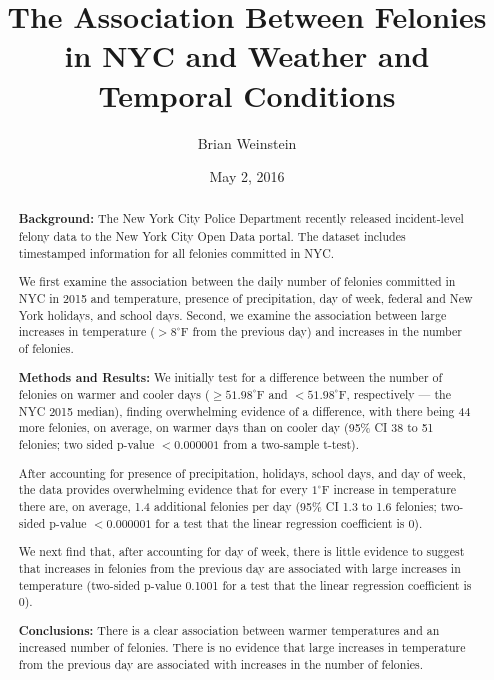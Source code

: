\documentclass[11pt,notitlepage]{article}
\newcommand{\degf}{^\circ\text{F}}
\begin{document}
\title{The Association Between Felonies in NYC and Weather and Temporal Conditions}
\author{Brian Weinstein}
\date{May 2, 2016}

\maketitle



\begin{abstract}
\singlespacing

\noindent \textbf{Background:} The New York City Police Department recently released incident-level felony data to the New York City Open Data portal. The dataset includes timestamped information for all felonies committed in NYC.

We first examine the association between the daily number of felonies committed in NYC in 2015 and temperature, presence of precipitation, day of week, federal and New York holidays, and school days. Second, we examine the association between large increases in temperature ($>8 \degf$ from the previous day) and increases in the number of felonies.

\noindent \textbf{Methods and Results:} We initially test for a difference between the number of felonies on warmer and cooler days ($\geq 51.98 \degf$ and $< 51.98 \degf$, respectively --- the NYC 2015 median), finding overwhelming evidence of a difference, with there being 44 more felonies, on average, on warmer days than on cooler day (95\% CI 38 to 51 felonies; two sided p-value $<0.000001$ from a two-sample t-test).

After accounting for presence of precipitation, holidays, school days, and day of week, the data provides overwhelming evidence that for every $1 \degf$ increase in temperature there are, on average, 1.4 additional felonies per day (95\% CI 1.3 to 1.6 felonies; two-sided p-value $<0.000001$ for a test that the linear regression coefficient is 0).

We next find that, after accounting for day of week, there is little evidence to suggest that increases in felonies from the previous day are associated with large increases in temperature (two-sided p-value 0.1001 for a test that the linear regression coefficient is 0).

\noindent \textbf{Conclusions:} There is a clear association between warmer temperatures and an increased number of felonies. There is no evidence that large increases in temperature from the previous day are associated with increases in the number of felonies.




\end{abstract}
\end{document}
